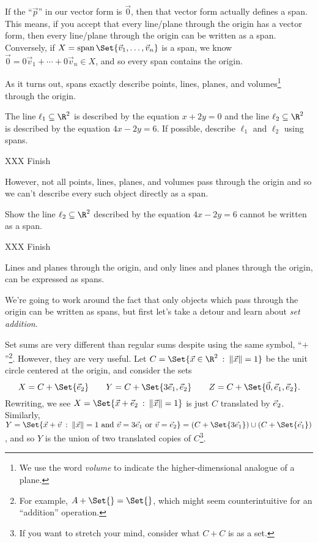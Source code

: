 If the ``$\vec p$'' in our vector form is $\vec 0$, then that vector form actually defines
a span. This means, if you accept that every line/plane through the origin has a
vector form, then every line/plane through the origin can be written as a span. Conversely,
if $X=\Span\Set{\vec v_1,\ldots,\vec v_n}$ is a span, we know $\vec 0=0\vec v_1+\cdots+0\vec v_n\in X$,
and so every span contains the origin.


As it turns out, spans exactly describe points, lines, planes, and volumes\footnote{
 We use the word \emph{volume} to indicate the higher-dimensional analogue of a plane.} through the origin.

\begin{example}
	The line $\ell_1\subseteq\R^2$ is described by the equation $x+2y=0$ and the line 
	$\ell_2\subseteq \R^2$ is described by the equation $4x-2y=6$.
	If possible, describe $\ell_1$ and $\ell_2$ using spans.

	XXX Finish
\end{example}

However, not all points, lines, planes, and volumes pass through the origin
and so we can't describe every such object directly as a span. 

\begin{example}
	Show the line $\ell_2\subseteq\R^2$ described by the equation $4x-2y=6$
	cannot be written as a span.

	XXX Finish
\end{example}

\begin{emphbox}[Takeaway]
	Lines and planes through the origin, and only lines and planes through the origin, can be expressed as spans.
\end{emphbox}

We're going to work around the fact that only objects which pass through the origin can be written as
spans, but first let's take a detour and learn about \emph{set addition}.


Set sums are very different than regular sums despite using the same symbol, ``$+$''\footnote{
For example, $A+\Set{}=\Set{}$, which might seem counterintuitive for an ``addition'' operation.
}.
 However, they are very useful.
Let $C=\Set{\vec x\in\R^2\given \norm{\vec x}=1}$ be the unit circle centered at the origin, and consider
the sets
\[
	X=C+\Set{\yhat}\qquad Y=C+\Set{3\xhat,\yhat}\qquad Z=C+\Set{\vec 0, \xhat,\yhat}.
\]
Rewriting, we see $X=\Set{\vec x+\yhat\given \norm{\vec x}=1}$ is just $C$ translated
by ${\vec e_2}$. Similarly, $Y=\Set{\vec x+\vec v\given \norm{\vec x}=1\text{ and }\vec v=3\xhat\text{
	or }\vec v=\yhat}=(C+\Set{3\xhat})\cup (C+\Set{\xhat})$, and so $Y$ is the union
of two translated copies of $C$\footnote{ If you want to stretch your mind, consider what $C+C$
is as a set.}.

